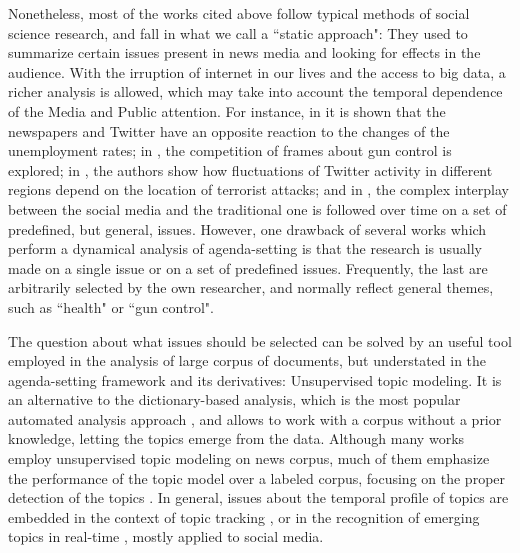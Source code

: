 \documentclass{bmcart}
\begin{document}
\par Nonetheless, most of the works cited above follow typical methods of social science research, and fall in what we call a ``static approach": They used to summarize certain issues present in news media and looking for effects in the audience.
With the irruption of internet in our lives and the access to big data, a richer analysis is allowed, which may take into account the temporal dependence of the Media and Public attention. 
For instance, in \cite{soroka2017negativity} it is shown that the newspapers and Twitter have an opposite reaction to the changes of the unemployment rates; in \cite{guggenheim2015dynamics}, the competition of frames about gun control is explored; in \cite{ali2018measuring}, the authors show how fluctuations of Twitter activity in different regions depend on the location of terrorist attacks; and in \cite{russell2014dynamics}, the complex interplay between the social media and the traditional one is followed over time on a set of predefined, but general, issues.
However, one drawback of several works which perform a dynamical analysis of agenda-setting is that the research is usually made on a single issue or on a set of predefined issues. Frequently, the last are arbitrarily selected by the own researcher, and normally reflect general themes, such as ``health" or ``gun control".

\par The question about what issues should be selected can be solved by an useful tool employed in the analysis of large corpus of documents, but understated in the agenda-setting framework and its derivatives: Unsupervised topic modeling. 
It is an alternative to the dictionary-based analysis, which is the most popular automated analysis approach \cite{guo2016big}, and allows to work with a corpus without a prior knowledge, letting the topics emerge from the data. 
Although many works employ unsupervised topic modeling on news corpus, much of them emphasize the performance of the topic model over a labeled corpus, focusing on the proper detection of the topics \cite{dai2010online, po2016topic, brun2000experiment}. 
In general, issues about the temporal profile of topics are embedded in the context of topic tracking \cite{hu2016news, li2017joint}, or in the recognition of emerging topics in real-time \cite{cataldi2010emerging}, mostly applied to social media. 
\end{document}
